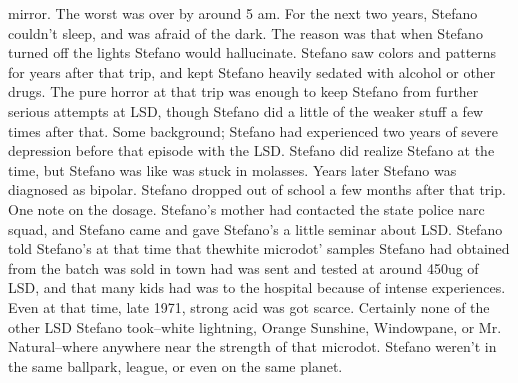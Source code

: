 \documentclass[12pt]{book}
\begin{document}
mirror. The worst was over by around 5 am. For the next two years, Stefano couldn't sleep, and was afraid of the dark. The reason was that when Stefano turned off the lights Stefano would hallucinate. Stefano saw colors and patterns for years after that trip, and kept Stefano heavily sedated with alcohol or other drugs. The pure horror at that trip was enough to keep Stefano from further serious attempts at LSD, though Stefano did a little of the weaker stuff a few times after that. Some background; Stefano had experienced two years of severe depression before that episode with the LSD. Stefano did realize Stefano at the time, but Stefano was like was stuck in molasses. Years later Stefano was diagnosed as bipolar. Stefano dropped out of school a few months after that trip. One note on the dosage. Stefano's mother had contacted the state police narc squad, and Stefano came and gave Stefano's a little seminar about LSD. Stefano told Stefano's at that time that thewhite microdot' samples Stefano had obtained from the batch was sold in town had was sent and tested at around 450ug of LSD, and that many kids had was to the hospital because of intense experiences. Even at that time, late 1971, strong acid was got scarce. Certainly none of the other LSD Stefano took--white lightning, Orange Sunshine, Windowpane, or Mr. Natural--where anywhere near the strength of that microdot. Stefano weren't in the same ballpark, league, or even on the same planet.
\end{document}
